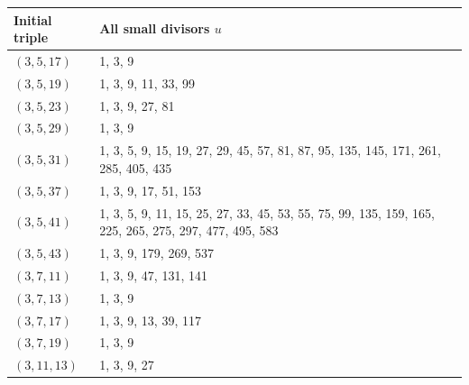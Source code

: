 \documentclass[11pt]{article}
\begin{document}
\small
\begin{longtable}[c]{@{}l p{11.4cm}@{}}
\toprule
Initial triple & All small divisors $u$\\
\midrule
\endhead
$(3,5,17)$ & 1, 3, 9\\[3pt]
$(3,5,19)$ & 1, 3, 9, 11, 33, 99\\[3pt]
$(3,5,23)$ & 1, 3, 9, 27, 81\\[3pt]
$(3,5,29)$ & 1, 3, 9\\[3pt]
$(3,5,31)$ & 1, 3, 5, 9, 15, 19, 27, 29, 45, 57, 81, 87, 95, 135, 145, 171, 261, 285, 405, 435\\[3pt]
$(3,5,37)$ & 1, 3, 9, 17, 51, 153\\[3pt]
$(3,5,41)$ & 1, 3, 5, 9, 11, 15, 25, 27, 33, 45, 53, 55, 75, 99, 135, 159, 165, 225, 265, 275, 297, 477, 495, 583\\[3pt]
$(3,5,43)$ & 1, 3, 9, 179, 269, 537\\[3pt]
$(3,7,11)$ & 1, 3, 9, 47, 131, 141\\[3pt]
$(3,7,13)$ & 1, 3, 9\\[3pt]
$(3,7,17)$ & 1, 3, 9, 13, 39, 117\\[3pt]
$(3,7,19)$ & 1, 3, 9\\[3pt]
$(3,11,13)$ & 1, 3, 9, 27\\[3pt]
\bottomrule
\end{longtable}
\normalsize



\end{document}
